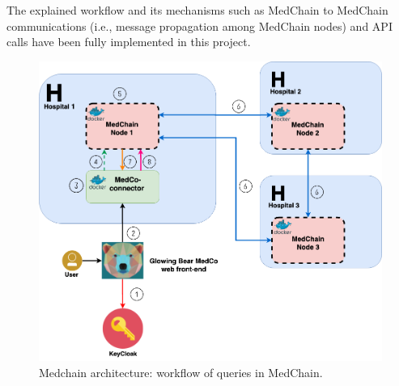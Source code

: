  
 The explained workflow and its mechanisms such as MedChain to MedChain communications (i.e., message propagation among MedChain nodes) and API calls have been fully implemented in this project. 
 
 \begin{figure}[htbp] 
        \centering \includegraphics[width=1\columnwidth]{Images/arch-updated.png}
        \caption{\label{fig:medchain_workflow} 
         Medchain architecture: workflow of queries in MedChain.
        }
\end{figure}
